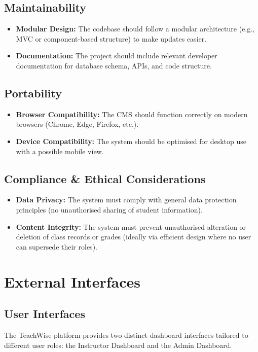 \subsection{Maintainability}
\begin{itemize}
    \item \textbf{Modular Design:} The codebase should follow a modular architecture (e.g., MVC or component-based structure) to make updates easier.
    \item \textbf{Documentation:} The project should include relevant developer documentation for database schema, APIs, and code structure.
\end{itemize}

\subsection{Portability}
\begin{itemize}
    \item \textbf{Browser Compatibility:} The CMS should function correctly on modern browsers (Chrome, Edge, Firefox, etc.).
    \item \textbf{Device Compatibility:} The system should be optimised for desktop use with a possible mobile view.
\end{itemize}

\subsection{Compliance \& Ethical Considerations}
\begin{itemize}
    \item \textbf{Data Privacy:} The system must comply with general data protection principles (no unauthorised sharing of student information).
    \item \textbf{Content Integrity:} The system must prevent unauthorised alteration or deletion of class records or grades (ideally via efficient design where no user can supersede their roles).
\end{itemize}

\section{External Interfaces}

\subsection{User Interfaces}
The TeachWise platform provides two distinct dashboard interfaces tailored to different user roles: the Instructor Dashboard and the Admin Dashboard.

